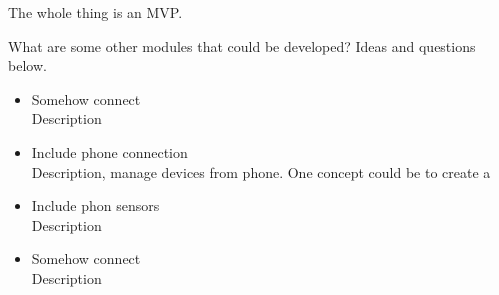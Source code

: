The whole thing is an MVP.

What are some other modules that could be developed? Ideas and questions below.

\begin{itemize}
    \item Somehow connect  \\
    Description \\
    \item Include phone connection \\
    Description, manage devices from phone. One concept could be to create a  \\
    \item Include phon sensors  \\
    Description \\
    \item Somehow connect  \\
    Description \\
\end{itemize}


